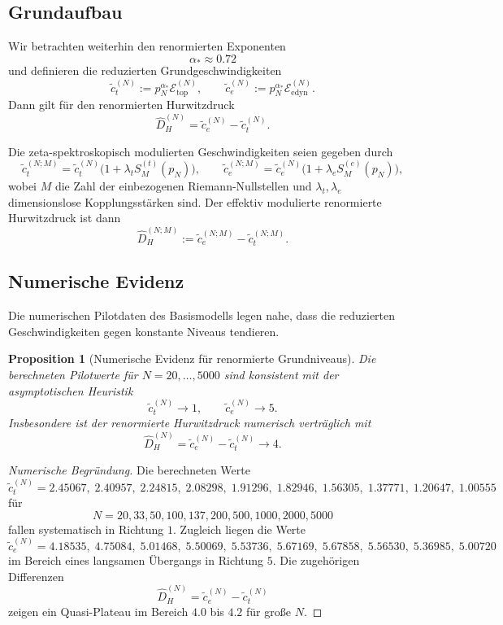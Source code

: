 \documentclass[12pt,a4paper]{article}
\newtheorem{proposition}[satz]{Proposition}
\theoremstyle{definition}
\begin{document}
	\subsection{Grundaufbau}
	
	Wir betrachten weiterhin den renormierten Exponenten
	\[
	\alpha_\ast \approx 0.72
	\]
	und definieren die reduzierten Grundgeschwindigkeiten
	\[
	\tilde c_t^{(N)}:=p_N^{\alpha_\ast}\mathcal E_{\mathrm{top}}^{(N)},
	\qquad
	\tilde c_e^{(N)}:=p_N^{\alpha_\ast}\mathcal E_{\mathrm{edyn}}^{(N)}.
	\]
	Dann gilt für den renormierten Hurwitzdruck
	\[
	\widehat D_H^{(N)}=\tilde c_e^{(N)}-\tilde c_t^{(N)}.
	\]
	
	Die zeta-spektroskopisch modulierten Geschwindigkeiten seien gegeben durch
	\[
	\tilde c_t^{(N;M)}
	=
	\tilde c_t^{(N)}\bigl(1+\lambda_t S_M^{(t)}(p_N)\bigr),
	\qquad
	\tilde c_e^{(N;M)}
	=
	\tilde c_e^{(N)}\bigl(1+\lambda_e S_M^{(e)}(p_N)\bigr),
	\]
	wobei \(M\) die Zahl der einbezogenen Riemann-Nullstellen und \(\lambda_t,\lambda_e\) dimensionslose Kopplungsstärken sind. Der effektiv modulierte renormierte Hurwitzdruck ist dann
	\[
	\widehat D_H^{(N;M)}:=\tilde c_e^{(N;M)}-\tilde c_t^{(N;M)}.
	\]
	
	\subsection{Numerische Evidenz}
	
	Die numerischen Pilotdaten des Basismodells legen nahe, dass die reduzierten Geschwindigkeiten gegen konstante Niveaus tendieren.
	
	\begin{proposition}[Numerische Evidenz für renormierte Grundniveaus]
		Die berechneten Pilotwerte für \(N=20,\dots,5000\) sind konsistent mit der asymptotischen Heuristik
		\[
		\tilde c_t^{(N)}\to 1,
		\qquad
		\tilde c_e^{(N)}\to 5.
		\]
		Insbesondere ist der renormierte Hurwitzdruck numerisch verträglich mit
		\[
		\widehat D_H^{(N)}=\tilde c_e^{(N)}-\tilde c_t^{(N)}\to 4.
		\]
	\end{proposition}
	
	\begin{proof}[Numerische Begründung]
		Die berechneten Werte
		\[
		\tilde c_t^{(N)}=
		2.45067,\;2.40957,\;2.24815,\;2.08298,\;1.91296,\;1.82946,\;1.56305,\;1.37771,\;1.20647,\;1.00555
		\]
		für
		\[
		N=20,33,50,100,137,200,500,1000,2000,5000
		\]
		fallen systematisch in Richtung \(1\). Zugleich liegen die Werte
		\[
		\tilde c_e^{(N)}=
		4.18535,\;4.75084,\;5.01468,\;5.50069,\;5.53736,\;5.67169,\;5.67858,\;5.56530,\;5.36985,\;5.00720
		\]
		im Bereich eines langsamen Übergangs in Richtung \(5\). Die zugehörigen Differenzen
		\[
		\widehat D_H^{(N)}=\tilde c_e^{(N)}-\tilde c_t^{(N)}
		\]
		zeigen ein Quasi-Plateau im Bereich \(4.0\) bis \(4.2\) für große \(N\).
	\end{proof}
	
\end{document}
